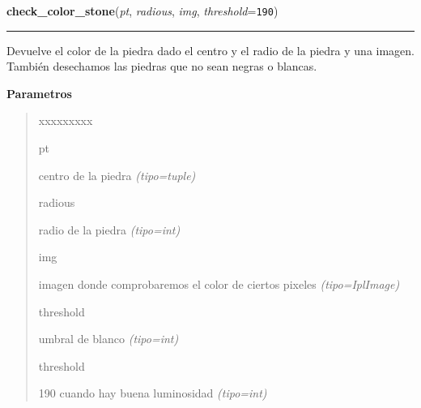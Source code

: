 \hspace{.8\funcindent}\begin{boxedminipage}{\funcwidth}

    \raggedright \textbf{check\_color\_stone}(\textit{pt}, \textit{radious}, \textit{img}, \textit{threshold}={\tt 190})

    \vspace{-1.5ex}

    \rule{\textwidth}{0.5\fboxrule}
\setlength{\parskip}{2ex}
Devuelve el color de la piedra dado el centro y el radio de la piedra y una imagen. También desechamos las piedras que no sean negras o blancas.

\setlength{\parskip}{1ex}
      \textbf{Parametros}
      \vspace{-1ex}

      \begin{quote}
        \begin{Ventry}{xxxxxxxxx}

          \item[pt]


centro de la piedra
            {\it (tipo=tuple)}

          \item[radious]


radio de la piedra
            {\it (tipo=int)}

          \item[img]


imagen donde comprobaremos el color de ciertos pixeles
            {\it (tipo=IplImage)}

          \item[threshold]


umbral de blanco
            {\it (tipo=int)}

          \item[threshold]


190 cuando hay buena luminosidad
            {\it (tipo=int)}

        \end{Ventry}

      \end{quote}

    \end{boxedminipage}



